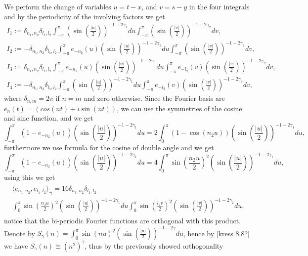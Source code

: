 \documentclass{article}
\newcommand{\todo}[1]{{\color{red}[#1]}}
\begin{document}
We perform the change of variables $u = t-x$, and $v = s-y$ in the four integrals and by the periodicity of the involving factors we get 
\begin{align*}
I_1 := \delta_{n_1,n_2}\delta_{l_1,l_2}\int_{-\pi}^{\pi}
\left(\sin\left(\frac{|u|}{2}\right)\right)^{-1-2\gamma_1}du
\int_{-\pi}^{\pi}  
\left(\sin\left(\frac{|v|}{2}\right)\right)^{-1-2\gamma_2}dv,\\
I_2 := -\delta_{n_1,n_2}\delta_{l_1,l_2}\int_{-\pi}^{\pi} e_{-n_2}(u)
\left(\sin\left(\frac{|u|}{2}\right)\right)^{-1-2\gamma_1}du
\int_{-\pi}^{\pi}  
\left(\sin\left(\frac{|v|}{2}\right)\right)^{-1-2\gamma_2}dv,\\
I_3 := \delta_{n_1,n_2}\delta_{l_1,l_2}\int_{-\pi}^{\pi} e_{-n_2}(u)
\left(\sin\left(\frac{|u|}{2}\right)\right)^{-1-2\gamma_1}du
\int_{-\pi}^{\pi}  e_{-l_2}(v)
\left(\sin\left(\frac{|v|}{2}\right)\right)^{-1-2\gamma_2}dv,\\
I_4 := -\delta_{n_1,n_2}\delta_{l_1,l_2}\int_{-\pi}^{\pi} 
\left(\sin\left(\frac{|u|}{2}\right)\right)^{-1-2\gamma_1}du
\int_{-\pi}^{\pi}  e_{-l_2}(v)
\left(\sin\left(\frac{|v|}{2}\right)\right)^{-1-2\gamma_2}dv,
\end{align*}
where $\delta_{n,m} = 2 \pi $ if $n=m$ and zero otherwise. Since the Fourier basis are $e_n(t) =  (cos(nt) + i \sin (nt)) $, we can use the symmetries of the cosine and sine function, and we get
$$
\int_{-\pi}^{\pi} (1-e_{-n_2}(u))
\left(\sin\left(\frac{|u|}{2}\right)\right)^{-1-2\gamma_1}du = 
2 \int_{0}^{\pi} (1-\cos(n_2 u))
\left(\sin\left(\frac{|u|}{2}\right)\right)^{-1-2\gamma_1}du,
$$
furthermore we use formula for the cosine of double angle and we get
$$
\int_{-\pi}^{\pi} (1-e_{-n_2}(u))
\left(\sin\left(\frac{|u|}{2}\right)\right)^{-1-2\gamma_1}du = 
4 \int_{0}^{\pi} \sin(\frac{n_2 u}{2}) ^2
\left(\sin\left(\frac{|u|}{2}\right)\right)^{-1-2\gamma_1}du,
$$
using this we get
\begin{align*}
\begin{split}
\langle e_{n_1,n_2}, e_{l_1,l_2} \rangle_{\mathbf{\gamma}}= 16 \delta_{n_1,n_2} \delta_{l_1,l_2}\\ \int_{0}^{\pi} \sin(\frac{n_2 u}{2}) ^2
\left(\sin\left(\frac{|u|}{2}\right)\right)^{-1-2\gamma_1}du 
\int_{0}^{\pi} \sin(\frac{l_2 v}{2}) ^2
\left(\sin\left(\frac{|v|}{2}\right)\right)^{-1-2\gamma_2}du,
\end{split}
\end{align*}
notice that the bi-periodic Fourier functions are orthogonal with this product. Denote by $S_\gamma(n) =\int_{0}^{\pi} \sin(n u) ^2
\left(\sin\left(\frac{|u|}{2}\right)\right)^{-1-2\gamma}du $, hence by \todo{kress 8.8?} we have $S_\gamma(n) \cong (n^2)^\gamma$, thus by the previously showed orthogonality  
\end{document}
